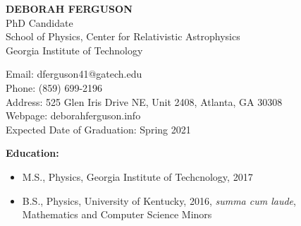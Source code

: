 \documentclass[11pt]{article}
\begin{document}
\begin{center}
  \textbf{DEBORAH FERGUSON}\\
  PhD Candidate\\
  School of Physics, Center for Relativistic Astrophysics\\
  Georgia Institute of Technology\\
\end{center}  

\begin{flushleft}

  Email: dferguson41@gatech.edu\\
  Phone: (859) 699-2196\\
  Address: 525 Glen Iris Drive NE, Unit 2408, Atlanta, GA 30308\\
  Webpage: deborahferguson.info\\
  Expected Date of Graduation: Spring 2021
  \vspace{8px}
  
  \textbf{Education:}
  \begin{itemize}
  \item M.S., Physics, Georgia Institute of Techcnology, 2017
  \item B.S., Physics, University of Kentucky, 2016, \textit{summa cum laude}, \\ Mathematics and Computer Science Minors
  \end{itemize}


\end{flushleft}
\end{document}
